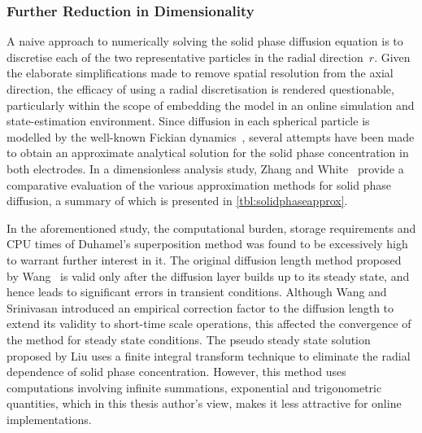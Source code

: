 

\subsubsection*{Further Reduction in Dimensionality}\label{subsec:basicspmfurtherdimensionalityreduction}

A naive approach to numerically solving the solid phase diffusion equation is to
discretise each of the two representative particles in the radial direction~$r$.
Given the elaborate  simplifications made to remove spatial  resolution from the
axial  direction, the  efficacy of  using  a radial  discretisation is  rendered
questionable, particularly within the scope of  embedding the model in an online
simulation and  state-estimation environment. Since diffusion  in each spherical
particle is modelled by the well-known Fickian dynamics~\cite{Fick1995}, several
attempts have  been made to  obtain an  approximate analytical solution  for the
solid phase concentration in both electrodes.
In a  dimensionless analysis study,  Zhang and White~\cite{Zhang2007}  provide a
comparative  evaluation of  the various  approximation methods  for solid  phase
diffusion, a summary of which is presented in \cref{tbl:solidphaseapprox}.



In  the   aforementioned  study,   the  computational  burden,   \viz{}  storage
requirements and  CPU times of  Duhamel's superposition  method was found  to be
excessively  high to  warrant further  interest  in it.  The original  diffusion
length method proposed  by Wang~\etal{} is valid only after  the diffusion layer
builds  up  to its  steady  state,  and hence  leads  to  significant errors  in
transient  conditions.  Although Wang  and  Srinivasan  introduced an  empirical
correction factor to  the diffusion length to extend its  validity to short-time
scale operations, this  affected the convergence of the method  for steady state
conditions.  The pseudo  steady state  solution proposed  by Liu  uses a  finite
integral  transform  technique  to  eliminate the  radial  dependence  of  solid
phase concentration.  However, this method uses  computations involving infinite
summations,  exponential  and trigonometric  quantities,  which  in this  thesis
author's view, makes it less attractive for online implementations.

